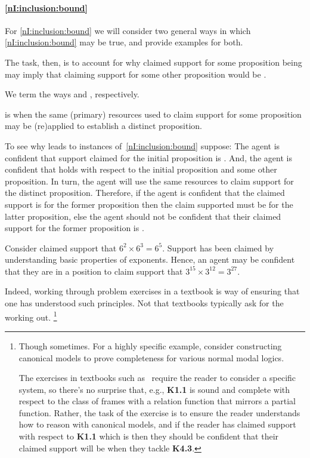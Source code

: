 \paragraph{\ref{nI:inclusion:bound}}

\begin{note}
  For \ref{nI:inclusion:bound} we will consider two general ways in which \ref{nI:inclusion:bound} may be true, and provide examples for both.

  The task, then, is to account for why claimed support for some proposition being \nmom{} may imply that claiming support for some other proposition would be \nmom{}.

  We term the ways \incl{} and \asso{}, respectively.
\end{note}


\begin{note}[Inclusion]
  \incl{} is when the same (primary) resources used to claim support for some proposition may be (re)applied to establish a distinct proposition.

  To see why \incl{} leads to instances of~\ref{nI:inclusion:bound} suppose:
  The agent is confident that support claimed for the initial proposition is \nmom{}.
  And, the agent is confident that \incl{} holds with respect to the initial proposition and some other proposition.
  In turn, the agent will use the same resources to claim support for the distinct proposition.
  Therefore, if the agent is confident that the claimed support is \nmom{} for the former proposition then the claim supported must be \nmom{} for the latter proposition, else the agent should not be confident that their claimed support for the former proposition is \nmom{}.

  \begin{illustration}
    Consider claimed support that \(6^{2} \times 6^{3} = 6^{5}\).
    Support has been claimed by understanding basic properties of exponents.
    Hence, an agent may be confident that they are in a position to claim support that \(3^{15} \times 3^{12} = 3^{27}\).
  \end{illustration}
  Indeed, working through problem exercises in a textbook is way of ensuring that one has understood such principles.
  Not that textbooks typically ask for the working out.\nolinebreak
  \footnote{
    Though sometimes.
    For a highly specific example, consider constructing canonical models to prove completeness for various normal modal logics.

    The exercises in textbooks such as~ require the reader to consider a specific system, so there's no surprise that, e.g., \textbf{K1.1} is sound and complete with respect to the class of frames with a relation function that mirrors a partial function.
    Rather, the task of the exercise is to ensure the reader understands how to reason with canonical models, and if the reader has claimed support with respect to \textbf{K1.1} which is \nmom{} then they should be confident that their claimed support will be \nmom{} when they tackle \textbf{K4.3}.

}
\end{note}

